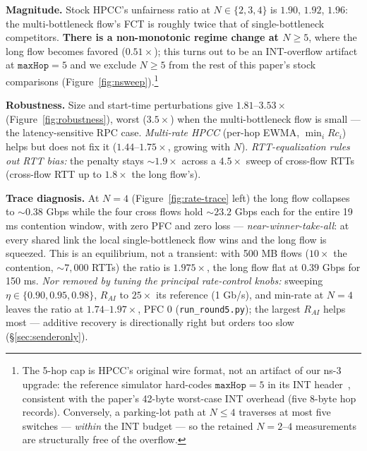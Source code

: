\documentclass[conference]{IEEEtran}
\renewcommand{\paragraph}[1]{\par\smallskip\noindent\textbf{#1}\hspace{0.5em}\ignorespaces}
\begin{document}
\paragraph{Magnitude.} Stock HPCC's unfairness ratio at $N \in \{2, 3, 4\}$ is $1.90$, $1.92$,
$1.96$: the multi-bottleneck flow's FCT is roughly twice that of single-bottleneck competitors.
\textbf{There is a non-monotonic regime change at $N \ge 5$}, where the long flow becomes
favored ($0.51\times$); this turns out to be an INT-overflow artifact at $\texttt{maxHop} = 5$
and we exclude $N \ge 5$ from the rest of this paper's stock comparisons
(Figure~\ref{fig:nsweep}).\footnote{The 5-hop cap is HPCC's original wire format, not an
artifact of our ns-3 upgrade: the reference simulator hard-codes $\texttt{maxHop}=5$ in its INT
header~\cite{hpccrepo}, consistent with the paper's 42-byte worst-case INT overhead (five
8-byte hop records). Conversely, a parking-lot path at $N \le 4$ traverses at most five
switches --- \emph{within} the INT budget --- so the retained $N = 2$--$4$ measurements are
structurally free of the overflow.}

\paragraph{Robustness.} Size and start-time perturbations give $1.81$--$3.53\times$
(Figure~\ref{fig:robustness}), worst ($3.5\times$) when the multi-bottleneck flow is small ---
the latency-sensitive RPC case. \emph{Multi-rate HPCC} (per-hop EWMA, $\min_i Rc_i$) helps but
does not fix it ($1.44$--$1.75\times$, growing with $N$). \emph{RTT-equalization rules out RTT
bias:} the penalty stays ${\sim}1.9\times$ across a $4.5\times$ sweep of cross-flow RTTs
(cross-flow RTT up to $1.8\times$ the long flow's).

\paragraph{Trace diagnosis.} At $N = 4$ (Figure~\ref{fig:rate-trace} left) the long flow
collapses to ${\sim}0.38$ Gbps while the four cross flows hold ${\sim}23.2$ Gbps each for the
entire 19 ms contention window, with zero PFC and zero loss --- \emph{near-winner-take-all}: at every
shared link the local single-bottleneck flow wins and the long flow is squeezed. This is an
equilibrium, not a transient: with 500 MB flows ($10\times$ the contention, ${\sim}7{,}000$
RTTs) the ratio is $1.975\times$, the long flow flat at $0.39$ Gbps for 150 ms.
\emph{Nor removed by tuning the principal rate-control knobs:} sweeping $\eta \in \{0.90, 0.95, 0.98\}$, $R_{AI}$ to
$25\times$ its reference (1 Gb/s), and min-rate at $N{=}4$ leaves the ratio at $1.74$--$1.97\times$, PFC $0$ (\texttt{run\_round5.py});
the largest $R_{AI}$ helps most --- additive recovery is directionally right but orders too
slow (\S\ref{sec:senderonly}).
\end{document}
